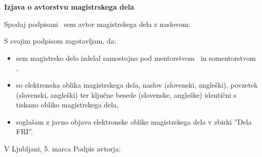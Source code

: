 \vspace*{1cm}
\begin{center}
{\Large \textbf{\sc Izjava o avtorstvu magistrskega dela}}
\end{center}

\vspace{1cm}
\noindent Spodaj podpisani \tauthor\ sem avtor magistrskega dela z naslovom:

\vspace{0.5cm}
\begin{center}
\emph{\ttitle}
\end{center}

\vspace{1cm}
\noindent S svojim podpisom zagotavljam, da:
\begin{itemize}
	\item sem magistrsko delo izdelal samostojno pod mentorstvom \mysupervisor\ in somentorstvom \mycosupervisor,

	\item so elektronska oblika magistrskega dela, naslov (slovenski, angleški), povzetek (slovenski, angleški) ter ključne besede (slovenske, angleške) identični s tiskano obliko magistrskega dela,
	\item soglašam z javno objavo elektronske oblike magistrskega dela v zbirki ''Dela FRI''.
\end{itemize}

\vspace{1cm}
\noindent V Ljubljani, 5. marca \myyear \hfill Podpis avtorja:
